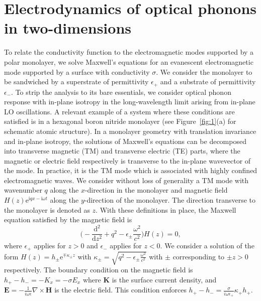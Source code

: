 \documentclass[aps,prb,twocolumn,
	           groupedaddress,superscriptaddress,
               amsfonts,amssymb,amsmath,floatfix,
	           citeautoscript]{revtex4-1}
\newcommand{\iu}{\mathrm{i}}
\newcommand{\e}{\mathrm{e}}
\newcommand{\dd}{\mathrm{d}}
\newcommand{\comment}[2]{%
    \ifbool{togglecomments}%
    {\textcolor{blue!70!black}{\small\textsf{%
    \textsuperscript{\textsc{\textsf{\MakeLowercase{#1}}}}%
    [#2]}}} %
    {}}     %
\begin{document}
\section{Electrodynamics of optical phonons in two-dimensions}
To relate the conductivity function  to the electromagnetic modes supported by a polar monolayer, we solve Maxwell's equations for an evanescent electromagnetic mode supported by a surface with conductivity $\sigma$. We consider the monolayer to be sandwiched by a superstrate of permittivity $\epsilon_+$ and a substrate of permittivity $\epsilon_-$. To strip the analysis to its bare essentials, we consider optical phonon response with in-plane isotropy in the long-wavelength limit arising from in-plane LO oscillations. A relevant example of a system where these conditions are satisfied is in a hexagonal boron nitride monolayer (see Figure~\ref{fig:1}(a) for schematic atomic structure). In a monolayer geometry with translation invariance and in-plane isotropy, the solutions of Maxwell's equations can be decomposed into transverse magnetic (TM) and transverse electric (TE) parts, where the magnetic or electric field respectively is transverse to the in-plane wavevector of the mode. In practice, it is the TM mode which is associated with highly confined electromagnetic waves.   We consider without loss of generality a TM mode with wavenumber $q$ along the $x$-direction in the monolayer and magnetic field $H(z)\e^{\iu qx-\iu\omega t}$ along the $y$-direction of the monolayer. The direction transverse to the monolayer is denoted as $z$.  With these definitions in place, the Maxwell equation satisfied by the magnetic field is 
\begin{equation}\label{eq:2dmaxwell}
    \bigg(-\frac{\dd^2}{\dd{}z^2}+q^2-\epsilon_{\pm}\frac{\omega^2}{c^2} \bigg)H(z) = 0,
\end{equation}
where $\epsilon_+$ applies for $z>0$ and $\epsilon_-$ applies for $z<0$.
We consider a solution of the form $H(z) = h_\pm\e^{\mp\kappa_\pm z}$ with $\kappa_\pm = \sqrt{q^2-\epsilon_{\pm} \frac{\omega^2}{c^2}}$ with $\pm$ corresponding to $\pm z > 0$ respectively.  The boundary condition on the magnetic field is $h_+ - h_- = -K_x = -\sigma E_x$ where $\mathbf{K}$ is the surface current density, and $\mathbf{E} = -\frac{1}{i\omega\epsilon}\nabla\times\mathbf{H}$ is the electric field. This condition enforces $h_+-h_- = \frac{\sigma}{i\omega\epsilon_+}\kappa_+h_+$. 
\end{document}
